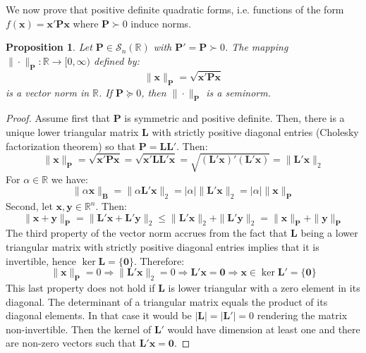 \documentclass[a4paper,10pt,oneside]{book}
\newtheorem{proposition}[theorem]{Proposition}
\begin{document}
We now prove that positive definite quadratic forms, i.e. functions of the form $f(\mathbf{x})=\mathbf{x}'\mathbf{Px}$ where $\mathbf{P}\succ 0$ induce norms.
\begin{proposition}
 Let $\mathbf{P}\in \mathcal{S}_n(\mathbb{R})$ with $\mathbf{P}'=\mathbf{P}\succ 0$. The mapping $\|\cdot\|_\mathbf{P}:\mathbb{R}\to [0,\infty)$ defined by:
\begin{equation}
 \|\mathbf{x}\|_\mathbf{P}=\sqrt{\mathbf{x}'\mathbf{Px}}
\end{equation}
is a vector norm in $\mathbb{R}$. If $\mathbf{P}\succeq 0$, then $\|\cdot\|_\mathbf{P}$ is a seminorm.
\end{proposition}
\begin{proof}
 Assume first that $\mathbf{P}$ is symmetric and positive definite. Then, there is a unique lower triangular matrix $\mathbf{L}$ with strictly positive diagonal entries (Cholesky factorization theorem) so that $\mathbf{P}=\mathbf{LL}'$. Then:
\begin{equation}
 \|\mathbf{x}\|_\mathbf{P}=\sqrt{\mathbf{x}'\mathbf{Px}}=\sqrt{\mathbf{x}'\mathbf{LL}'\mathbf{x}}=\sqrt{(\mathbf{L}'\mathbf{x})'(\mathbf{L}'\mathbf{x})}=\|\mathbf{L}'\mathbf{x}\|_2
\end{equation}
For $\alpha\in\mathbb{R}$ we have:
\begin{equation}
 \|\alpha\mathbf{x}\|_\mathbf{B}=\|\alpha\mathbf{L}'\mathbf{x}\|_2=|\alpha|\|\mathbf{L}'\mathbf{x}\|_2=|\alpha|\|\mathbf{x}\|_\mathbf{P}
\end{equation}
Second, let $\mathbf{x},\mathbf{y}\in\mathbb{R}^n$. Then:
\begin{equation}
 \|\mathbf{x}+\mathbf{y}\|_\mathbf{P}=\|\mathbf{L'}\mathbf{x}+\mathbf{L}'\mathbf{y}\|_2\leq\|\mathbf{L}'\mathbf{x}\|_2+\|\mathbf{L}'\mathbf{y}\|_2=\|\mathbf{x}\|_\mathbf{P}+\|\mathbf{y}\|_\mathbf{P}
\end{equation}
The third property of the vector norm accrues from the fact that $\mathbf{L}$ being a lower triangular matrix with strictly positive diagonal entries implies that it is invertible, hence $\operatorname{ker}\mathbf{L}=\{\mathbf{0}\}$. Therefore:
\begin{equation}
 \|\mathbf{x}\|_\mathbf{P}=0\Rightarrow\|\mathbf{L}'\mathbf{x}\|_2=0\Rightarrow \mathbf{L}'\mathbf{x}=\mathbf{0}\Rightarrow\mathbf{x}\in \operatorname{ker}\mathbf{L}'=\{\mathbf{0}\}
\end{equation}
This last property does not hold if $\mathbf{L}$ is lower triangular with a zero element in its diagonal. The determinant of a triangular matrix equals the product of its diagonal elements. In that case it would be $|\mathbf{L}|=|\mathbf{L}'|=0$ rendering the matrix non-invertible. Then the kernel of $\mathbf{L}'$ would have dimension at least one and there are non-zero vectors such that $\mathbf{L}'\mathbf{x}=\mathbf{0}$.
\end{proof}
\end{document}
